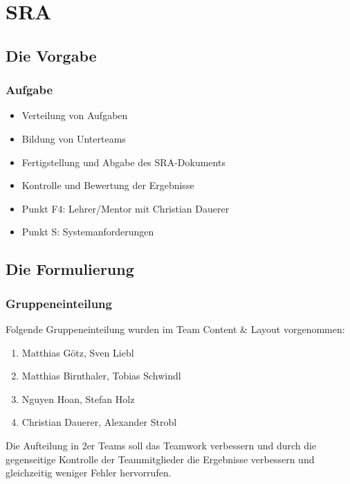 \section{SRA}
\subsection{Die Vorgabe}
\begin{frame} %
  \frametitle{Aufgabe} %

  	\begin{itemize}
   		\item Verteilung von Aufgaben
   		\item Bildung von Unterteams
   		\item Fertigstellung und Abgabe des SRA-Dokuments
   		\item Kontrolle und Bewertung der Ergebnisse
  	\end{itemize}
	\bigskip {}
	\begin{itemize}
		\item Punkt F4: Lehrer/Mentor mit Christian Dauerer
		\item Punkt S: Systemanforderungen
	\end{itemize}
\end{frame}

\subsection{Die Formulierung}
\begin{frame} %
  \frametitle{Gruppeneinteilung} %
  
  Folgende Gruppeneinteilung wurden im Team Content \& Layout vorgenommen:
  \begin{block}{}
  	\begin{enumerate}
  		\item Matthias Götz, Sven Liebl
  		\item Matthias Birnthaler, Tobias Schwindl
  		\item Nguyen Hoan, Stefan Holz
  		\item Christian Dauerer, Alexander Strobl
  	\end{enumerate}
  \end{block}
  Die Aufteilung in 2er Teams soll das Teamwork verbessern und durch die gegenseitige Kontrolle der Teammitglieder die Ergebnisse verbessern und gleichzeitig weniger Fehler hervorrufen.
\end{frame}

